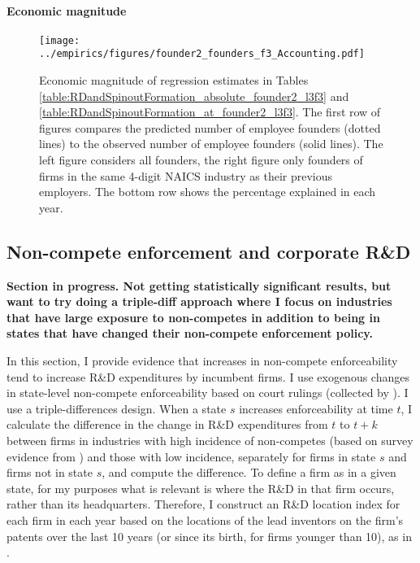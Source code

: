 \documentclass[12pt,english]{article}
\theoremstyle{remark}
\begin{document}
\paragraph{Economic magnitude}

\begin{figure}[!htb]
	\texttt{[image: ../empirics/figures/founder2\_founders\_f3\_Accounting.pdf]}
	\caption{Economic magnitude of regression estimates in Tables \ref{table:RDandSpinoutFormation_absolute_founder2_l3f3} and \ref{table:RDandSpinoutFormation_at_founder2_l3f3}. The first row of figures compares the predicted number of employee founders (dotted lines) to the observed number of employee founders (solid lines). The left figure considers all founders, the right figure only founders of firms in the same 4-digit NAICS industry as their previous employers. The bottom row shows the percentage explained in each year.}
	\label{figure:founder2_founders_f3_Accounting.pdf}
\end{figure}

\subsection{Non-compete enforcement and corporate R\&D}

\textbf{Section in progress. Not getting statistically significant results, but want to try doing a triple-diff approach where I focus on industries that have large exposure to non-competes in addition to being in states that have changed their non-compete enforcement policy.}

In this section, I provide evidence that increases in non-compete enforceability tend to increase R\&D expenditures by incumbent firms. I use exogenous changes in state-level non-compete enforceability based on court rulings (collected by \cite{jeffers_impact_2018}). I use a triple-differences design. When a state $s$ increases enforceability at time $t$, I calculate the difference in the change in R\&D expenditures from $t$ to $t+k$ between firms in industries with high incidence of non-competes (based on survey evidence from \cite{starr_noncompetes_2019}) and those with low incidence, separately for firms in state $s$ and firms not in state $s$, and compute the difference. To define a firm as in a given state, for my purposes what is relevant is where the R\&D in that firm occurs, rather than its headquarters. Therefore, I construct an R\&D location index for each firm in each year based on the locations of the lead inventors on the firm's patents over the last 10 years (or since its birth, for firms younger than 10), as in \cite{bloom_identifying_2013}. 
\end{document}
